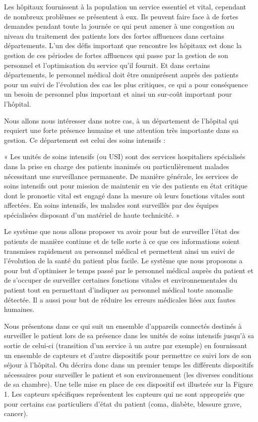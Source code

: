 \documentclass{article}
\begin{document}
 Les hôpitaux fournissent à la population un service essentiel et vital, cependant de nombreux problèmes se présentent à eux. Ils peuvent faire face à de fortes demandes pendant toute la journée ce qui peut amener à une congestion au niveau du traitement des patients lors des fortes affluences dans certains départements. L’un des défis important que rencontre les hôpitaux est donc la gestion de ces périodes de fortes affluences qui passe par la gestion de son personnel et l’optimisation du service qu’il fournit. Et dans certains départements, le personnel médical doit être omniprésent auprès des patients pour un suivi de l’évolution des cas les plus critiques, ce qui a pour conséquence un besoin de personnel plus important et ainsi un sur-coût important pour l’hôpital.
 
 Nous allons nous intéresser dans notre cas, à un département de l’hôpital qui requiert une forte présence humaine et une attention très importante dans sa gestion. Ce département est celui des soins intensifs :
 
 « Les unités de soins intensifs (ou USI) sont des services hospitaliers spécialisés dans la prise en charge des patients inanimés ou particulièrement malades nécessitant une surveillance permanente. De manière générale, les services de soins intensifs ont pour mission de maintenir en vie des patients en état critique dont le pronostic vital est engagé dans la mesure où leurs fonctions vitales sont affectées. En soins intensifs, les malades sont surveillés par des équipes spécialisées disposant d'un matériel de haute technicité. » \cite{SoinsIntensifs}

Le système que nous allons proposer va avoir pour but de surveiller l’état des patients de manière continue et de telle sorte à ce que ces informations soient transmises rapidement au personnel médical et permettent ainsi un suivi de l’évolution de la santé du patient plus facile. Le système que nous proposons a pour but d’optimiser le temps passé par le personnel médical auprès du patient et de s’occuper de surveiller certaines fonctions vitales et environnementales du patient tout en permettant d’indiquer au personnel médical toute anomalie détectée. Il a aussi pour but de réduire les erreurs médicales liées aux fautes humaines. 

Nous présentons dans ce qui suit un ensemble d’appareils connectés destinés à surveiller le patient lors de sa présence dans les unités de soins intensifs jusqu'à sa sortie de celui-ci (transition d’un service à un autre par exemple) en fournissant un ensemble de capteurs et d’autre dispositifs pour permettre ce suivi lors de son séjour à l’hôpital. On décrira donc dans un premier temps les différents dispositifs nécessaires pour surveiller le patient et son environnement (les diverses conditions de sa chambre). Une telle mise en place de ces dispositif est illustrée sur la Figure 1. Les capteurs spécifiques représentent les capteurs qui ne sont appropriés que pour certains cas particuliers d’état du patient (coma, diabète, blessure grave, cancer).
\end{document}
